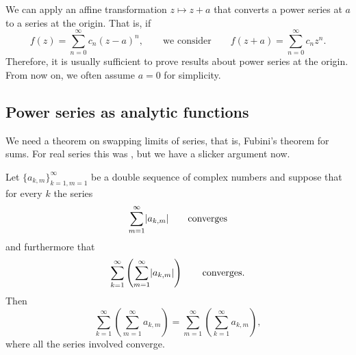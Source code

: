 \medskip

We can apply an affine transformation $z \mapsto z+a$ that
converts a power series at $a$ to a series at the origin.
That is, if
\begin{equation*}
f(z) = \sum_{n=0}^\infty c_n {(z-a)}^n,
\qquad \text{we consider} \qquad
f(z+a) = \sum_{n=0}^\infty c_n {z}^n.
\end{equation*}
Therefore, it is usually
sufficient to prove results about power series at the origin.
From now on, we often assume $a=0$ for simplicity.

\subsection{Power series as analytic functions}

We need a theorem on swapping limits of series, that is, 
Fubini's theorem for sums.  For real series this was
, but we have a slicker
argument now.

\begin{thm} \label{thm:fubiniforsums}
Let $\{ a_{k,m} \}_{k=1,m=1}^\infty$ be a double
sequence of complex numbers and suppose that for every $k$ the series
\begin{equation*}
\sum_{m=1}^\infty \lvert {a_{k,m}} \rvert \qquad \text{converges}
\end{equation*}
and furthermore that
\begin{equation*}
\sum_{k=1}^\infty \left( \sum_{m=1}^\infty \lvert {a_{k,m}} \rvert \right)
\qquad \text{converges}.
\end{equation*}
Then
\begin{equation*}
\sum_{k=1}^\infty \left( \sum_{m=1}^\infty a_{k,m} \right)
=
\sum_{m=1}^\infty \left( \sum_{k=1}^\infty a_{k,m} \right) ,
\end{equation*}
where all the series involved converge.
\end{thm}


